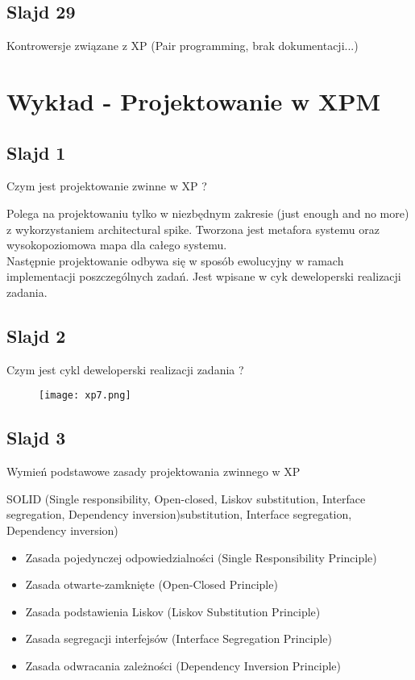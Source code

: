 \documentclass[a4paper,15pt]{article}
\begin{document}
\subsection{Slajd 29}
Kontrowersje związane z XP (Pair programming, brak dokumentacji...)

\newpage
\section{Wykład - Projektowanie w XPM}

\subsection{Slajd 1}
\begin{framed}
Czym jest projektowanie zwinne w XP ?
\end{framed}
Polega na projektowaniu tylko w niezbędnym zakresie (just enough and no more) z wykorzystaniem architectural spike. Tworzona jest metafora systemu oraz wysokopoziomowa mapa dla całego systemu. \\ Następnie projektowanie odbywa się w sposób ewolucyjny w ramach implementacji poszczególnych zadań. Jest wpisane w cyk deweloperski realizacji zadania.

\subsection{Slajd 2}
\begin{framed}
Czym jest cykl deweloperski realizacji zadania ?
\end{framed}

\begin{figure}[H]
\centerline{\texttt{[image: xp7.png]}}
\end{figure}


\subsection{Slajd 3}
\begin{framed}
Wymień podstawowe zasady projektowania zwinnego w XP
\end{framed}
SOLID (Single responsibility, Open-closed, Liskov substitution, Interface segregation, Dependency inversion)substitution, Interface segregation, Dependency inversion)
\begin{itemize}
\item Zasada pojedynczej odpowiedzialności (Single Responsibility Principle)
\item Zasada otwarte-zamknięte (Open-Closed Principle)
\item Zasada podstawienia Liskov (Liskov Substitution Principle)
\item Zasada segregacji interfejsów (Interface Segregation Principle) 
\item Zasada odwracania zależności (Dependency Inversion Principle)
\end{itemize}
\end{document}
